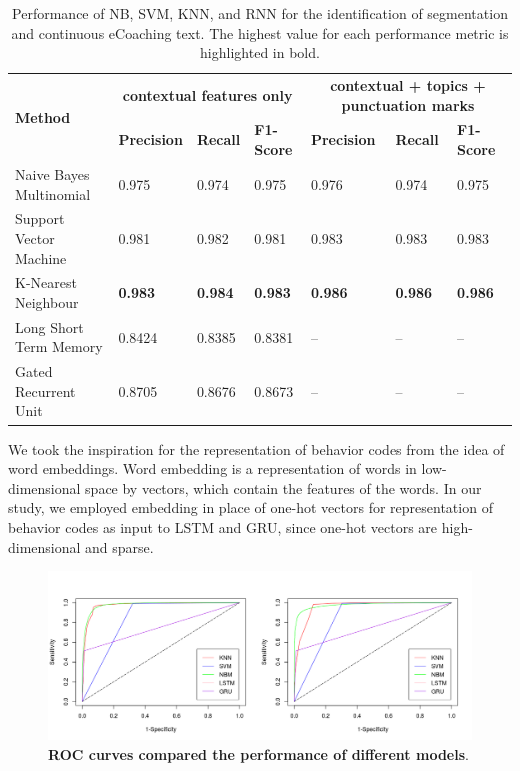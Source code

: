 \documentclass{amia}
\begin{document}
\begin{table}[ht]
\centering
\caption{Performance of NB, SVM, KNN, and RNN for the identification of segmentation and continuous eCoaching text. The highest value for each performance metric is highlighted in bold.}
\label{tab:result_under_over_sampled}
  \begin{tabular}{|l|l|l|l|l|l|l|}
  \hline
   \multirow{2}{*}{\textbf{Method}} & \multicolumn{3}{|c|}{\textbf{contextual features only}} & \multicolumn{3}{|c|}{\textbf{contextual + topics + punctuation marks}} \\\cline{2-7}
   & \textbf{Precision}  & \textbf{Recall} & \textbf{F1-Score} & \textbf{Precision}  & \textbf{Recall} & \textbf{F1-Score}\\ \hline    
    
 Naive Bayes Multinomial & 0.975 & 0.974 & 0.975 & 0.976 & 0.974 & 0.975 \\ \hline
 Support Vector Machine & 0.981 & 0.982 & 0.981 & 0.983 & 0.983 & 0.983\\ \hline
 K-Nearest Neighbour & \textbf{0.983} & \textbf{0.984} & \textbf{0.983} & \textbf{0.986} & \textbf{0.986} & \textbf{0.986}\\ \hline
 Long Short Term Memory & 0.8424 & 0.8385 & 0.8381 & -- & -- & --\\ \hline
 Gated Recurrent Unit & 0.8705 & 0.8676 & 0.8673 & -- & -- & --\\ \hline 
  \end{tabular}
\end{table} 

We took the inspiration for the representation of behavior codes from the idea of word embeddings. Word embedding is a representation of words in
low-dimensional space by vectors, which contain the features of the words. In our study, we employed embedding in place of one-hot vectors for representation of behavior codes as input to LSTM and GRU, since one-hot vectors are high-dimensional and sparse. 

\begin{figure}[!htb]
    \centering
    \includegraphics[width=1.0\textwidth]{figures/roc-curves.png}
    \caption{\textbf{ROC curves compared the performance of different models}.}
    \label{fig:roc-curves}
\end{figure}
\end{document}
